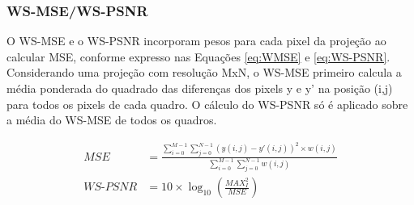 \begin{figure}[h]
        \centering
        \quad
\end{figure}

\subsubsection{WS-MSE/WS-PSNR}

O WS-MSE e o WS-PSNR incorporam pesos para cada pixel da projeção ao calcular MSE, conforme expresso nas Equações \ref{eq:WMSE} e \ref{eq:WS-PSNR}. Considerando uma projeção com resolução MxN, o WS-MSE primeiro calcula a média ponderada do quadrado das diferenças dos pixels y e y' na posição (i,j) para todos os pixels de cada quadro. O cálculo do WS-PSNR só é aplicado sobre a média do WS-MSE de todos os quadros.

\begin{align}
        \label{eq:WMSE}
        MSE&= \frac{\sum^{M-1}_{i=0}\sum^{N-1}_{j=0} \left(y(i,j) - y'(i,j)\right)^2 \times w(i,j)}{\sum^{M-1}_{i=0} \sum^{N-1}_{j=0} w(i,j)}\\[12pt]
        \label{eq:WS-PSNR}
        WS\mbox{-}PSNR&=10 \times \log_{10}\left(\frac{MAX^2_I}{MSE}\right)
\end{align}

